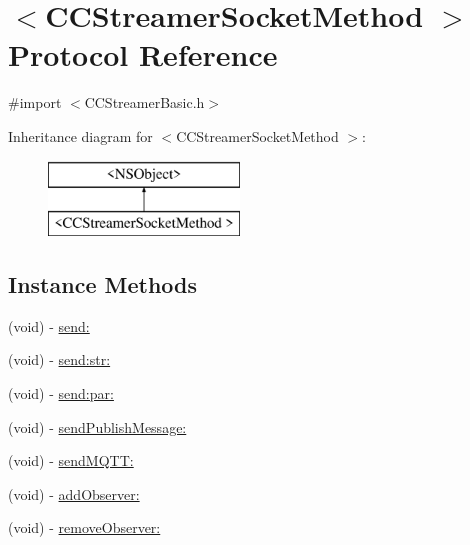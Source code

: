 \hypertarget{protocol_c_c_streamer_socket_method_01-p}{}\section{$<$C\+C\+Streamer\+Socket\+Method $>$ Protocol Reference}
\label{protocol_c_c_streamer_socket_method_01-p}


{\ttfamily \#import $<$C\+C\+Streamer\+Basic.\+h$>$}

Inheritance diagram for $<$C\+C\+Streamer\+Socket\+Method $>$\+:\begin{figure}[H]
\begin{center}
\leavevmode
\includegraphics[height=2.000000cm]{protocol_c_c_streamer_socket_method_01-p}
\end{center}
\end{figure}
\subsection*{Instance Methods}
\begin{DoxyCompactItemize}
\item 
(void) -\/ \hyperlink{protocol_c_c_streamer_socket_method_01-p_a7ead0de5b325c2bfdb890512aafb18bb}{send\+:}
\item 
(void) -\/ \hyperlink{protocol_c_c_streamer_socket_method_01-p_aa89da81bd3bdda8374abd942e67bc90d}{send\+:str\+:}
\item 
(void) -\/ \hyperlink{protocol_c_c_streamer_socket_method_01-p_aaac7f842265b2ae42b98ce73d3091d0b}{send\+:par\+:}
\item 
(void) -\/ \hyperlink{protocol_c_c_streamer_socket_method_01-p_a944b91cb987fa84a5b904fcb3f7afe05}{send\+Publish\+Message\+:}
\item 
(void) -\/ \hyperlink{protocol_c_c_streamer_socket_method_01-p_a5a012fcd5690c87011d03ab31330217c}{send\+M\+Q\+T\+T\+:}
\item 
(void) -\/ \hyperlink{protocol_c_c_streamer_socket_method_01-p_a6da75fcd5903fd74e1e3a7d8e15be8ff}{add\+Observer\+:}
\item 
(void) -\/ \hyperlink{protocol_c_c_streamer_socket_method_01-p_a9541f37f0da9ed583bc0ce0998c04458}{remove\+Observer\+:}
\end{DoxyCompactItemize}



